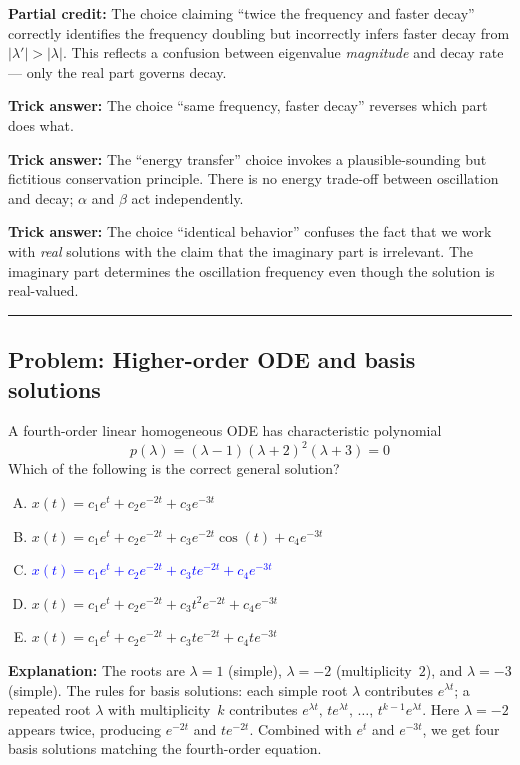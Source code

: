 \documentclass[12pt]{amsart}
\newcommand{\divider}{
  \vspace{-1em}
  \noindent
  \raisebox{-0.15ex}{\textbullet}%
  \hspace{0.5em}%
  \rule[0.5ex]{0.95\textwidth}{1.0pt}%
  \hspace{0.5em}%
  \raisebox{-0.15ex}{\textbullet}%
  \vspace{0em}
}
\begin{document}
\textbf{Partial credit:}
The choice claiming ``twice the frequency and faster decay'' correctly
identifies the frequency doubling but incorrectly infers faster decay from
$|\lambda'| > |\lambda|$. This reflects a confusion between eigenvalue
\emph{magnitude} and decay rate --- only the real part governs decay.

\textbf{Trick answer:}
The choice ``same frequency, faster decay'' reverses which part does what.

\textbf{Trick answer:}
The ``energy transfer'' choice invokes a plausible-sounding but fictitious
conservation principle. There is no energy trade-off between oscillation
and decay; $\alpha$ and $\beta$ act independently.

\textbf{Trick answer:}
The choice ``identical behavior'' confuses the fact that we work with
\emph{real} solutions with the claim that the imaginary part is irrelevant.
The imaginary part determines the oscillation frequency even though the
solution is real-valued.

\divider

\subsection*{Problem: Higher-order ODE and basis solutions}

A fourth-order linear homogeneous ODE has characteristic polynomial
$$p(\lambda) = (\lambda - 1)(\lambda + 2)^2(\lambda + 3) = 0$$
Which of the following is the correct general solution?

\begin{enumerate}[(A)]
\item $x(t) = c_1 e^{t} + c_2 e^{-2t} + c_3 e^{-3t}$
\item $x(t) = c_1 e^{t} + c_2 e^{-2t} + c_3 e^{-2t}\cos(t) + c_4 e^{-3t}$
\item \textcolor{blue}{\textbf{$x(t) = c_1 e^{t} + c_2 e^{-2t}
      + c_3 te^{-2t} + c_4 e^{-3t}$}}
\item $x(t) = c_1 e^{t} + c_2 e^{-2t} + c_3 t^2 e^{-2t} + c_4 e^{-3t}$
\item $x(t) = c_1 e^{t} + c_2 e^{-2t} + c_3 te^{-2t} + c_4 te^{-3t}$
\end{enumerate}

\textbf{Explanation:}
The roots are $\lambda = 1$ (simple), $\lambda = -2$ (multiplicity~$2$),
and $\lambda = -3$ (simple). The rules for basis solutions:
each simple root $\lambda$ contributes $e^{\lambda t}$;
a repeated root $\lambda$ with multiplicity~$k$ contributes
$e^{\lambda t},\, te^{\lambda t},\, \ldots,\, t^{k-1}e^{\lambda t}$.
Here $\lambda = -2$ appears twice, producing $e^{-2t}$ and $te^{-2t}$.
Combined with $e^{t}$ and $e^{-3t}$, we get four basis solutions matching
the fourth-order equation.
\end{document}
